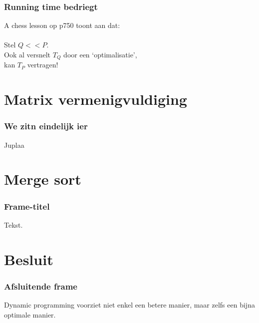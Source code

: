 \documentclass
   [kulak] %
   {kulakbeamer}
\begin{document}
\begin{frame}
	\frametitle{Running time bedriegt}
	A chess lesson op p750 toont aan dat:\\~\\
	Stel $Q << P.$\\
	Ook al versnelt $T_Q$ door een `optimalisatie',\\
	kan $T_P$ vertragen!
\end{frame}

\section[Matrix]{Matrix vermenigvuldiging}

\begin{frame}
	\frametitle{We zitn eindelijk ier}
	Juplaa
\end{frame}

\section[Merge sort]{Merge sort}

\begin{frame}
	\frametitle{Frame-titel}
	Tekst.
\end{frame}

\section{Besluit}
\begin{frame}
\frametitle{Afsluitende frame}
Dynamic programming voorziet niet enkel een betere manier, maar zelfs een bijna optimale manier.
\end{frame}
\end{document}
